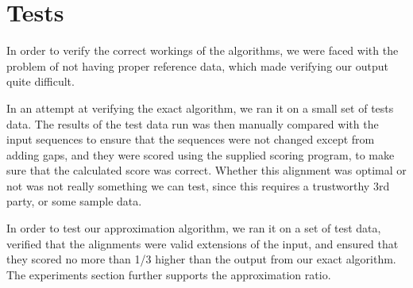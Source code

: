 \section{Tests}
In order to verify the correct workings of the algorithms, we were faced with the problem of not having proper reference data, which made verifying our output quite difficult.

In an attempt at verifying the exact algorithm, we ran it on a small set of tests data. The results of the test data run was then manually compared with the input sequences to ensure that the sequences were not changed except from adding gaps, and they were scored using the supplied scoring program, to make sure that the calculated score was correct. Whether this alignment was optimal or not was not really something we can test, since this requires a trustworthy 3rd party, or some sample data.

In order to test our approximation algorithm, we ran it on a set of test data, verified that the alignments were valid extensions of the input, and ensured that they scored no more than 1/3 higher than the output from our exact algorithm. The experiments section further supports the approximation ratio.